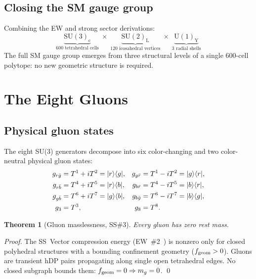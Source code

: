 \documentclass[11pt,a4paper]{article}
\newtheorem{theorem}{Theorem}[section]
\newcommand{\ket}[1]{|#1\rangle}
\newcommand{\bra}[1]{\langle#1|}
\begin{document}
\subsection{Closing the SM gauge group}

Combining the EW and strong sector derivations:
\begin{equation}
\underbrace{\mathrm{SU(3)_c}}_{\text{600 tetrahedral cells}}
\;\times\;
\underbrace{\mathrm{SU(2)_L}}_{\text{120 icosahedral vertices}}
\;\times\;
\underbrace{\mathrm{U(1)_Y}}_{\text{3 radial shells}}
\label{eq:SM_gauge}
\end{equation}
The full SM gauge group emerges from three structural levels of a
single 600-cell polytope: no new geometric structure is required.

\section{The Eight Gluons}
\label{sec:gluons}

\subsection{Physical gluon states}

The eight SU(3) generators decompose into six color-changing and
two color-neutral physical gluon states:
\begin{align}
g_{r\bar{g}} &= T^1+iT^2 = \ket{r}\bra{g}, &
g_{g\bar{r}} &= T^1-iT^2 = \ket{g}\bra{r}, \notag\\
g_{r\bar{b}} &= T^4+iT^5 = \ket{r}\bra{b}, &
g_{b\bar{r}} &= T^4-iT^5 = \ket{b}\bra{r}, \notag\\
g_{g\bar{b}} &= T^6+iT^7 = \ket{g}\bra{b}, &
g_{b\bar{g}} &= T^6-iT^7 = \ket{b}\bra{g}, \notag\\
g_3 &= T^3, & g_8 &= T^8. \label{eq:gluons}
\end{align}

\begin{theorem}[Gluon masslessness, SS\#3]
\label{thm:massless}
Every gluon has zero rest mass.
\end{theorem}

\begin{proof}
The SS~Vector compression energy (EW~\#2~\citep{cpp_ew2})
is nonzero only for closed polyhedral structures with a bounding
confinement geometry ($f_{\rm geom} > 0$).  Gluons are transient
hDP pairs propagating along single open tetrahedral edges.  No
closed subgraph bounds them: $f_{\rm geom} = 0 \Rightarrow m_g = 0$.
\qed
\end{proof}
\end{document}
